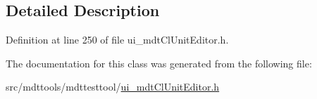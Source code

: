 \subsection{Detailed Description}


Definition at line 250 of file ui\-\_\-mdt\-Cl\-Unit\-Editor.\-h.



The documentation for this class was generated from the following file\-:\begin{DoxyCompactItemize}
\item 
src/mdttools/mdttesttool/\hyperlink{ui__mdt_cl_unit_editor_8h}{ui\-\_\-mdt\-Cl\-Unit\-Editor.\-h}\end{DoxyCompactItemize}
